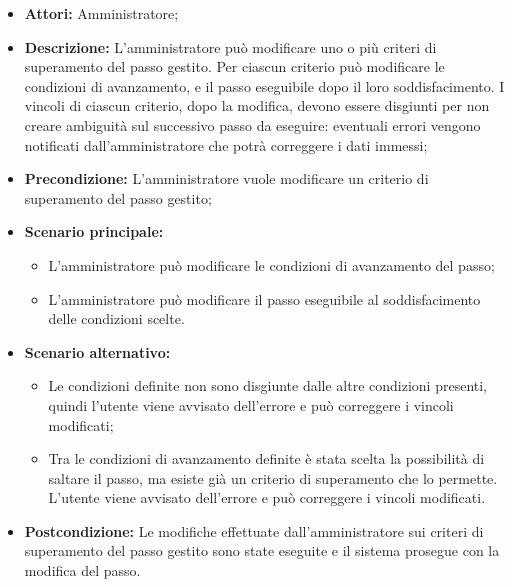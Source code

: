 \begin{itemize}
\item \textbf{Attori:}
Amministratore;
\item \textbf{Descrizione:}
L'amministratore può modificare uno o più criteri di superamento del passo gestito.
Per ciascun criterio può modificare le condizioni di avanzamento, e il passo eseguibile dopo il loro soddisfacimento.
I vincoli di ciascun criterio, dopo la modifica, devono essere disgiunti per non creare ambiguità sul successivo passo da eseguire: eventuali
errori vengono notificati dall'amministratore che potrà correggere i dati immessi;
\item \textbf{Precondizione:}
L'amministratore vuole modificare un criterio di superamento del passo gestito;
\item \textbf{Scenario principale:}
\begin{itemize}
\item L'amministratore può modificare le condizioni di avanzamento del passo;
\item L'amministratore può modificare il passo eseguibile al soddisfacimento delle condizioni scelte.
\end{itemize}
\item \textbf{Scenario alternativo:}
\begin{itemize}
\item Le condizioni definite non sono disgiunte dalle altre condizioni presenti, quindi l'utente viene avvisato dell'errore e può correggere i vincoli modificati;
\item Tra le condizioni di avanzamento definite è stata scelta la possibilità di saltare il passo, ma esiste già un criterio di superamento che lo permette. L'utente viene avvisato dell'errore e può correggere i vincoli modificati.
\end{itemize}
\item \textbf{Postcondizione:}
Le modifiche effettuate dall'amministratore sui criteri di superamento del passo gestito sono state eseguite e il sistema prosegue con la modifica del passo.
\end{itemize}

\hypertarget{A1.3.3.3.1}{}
